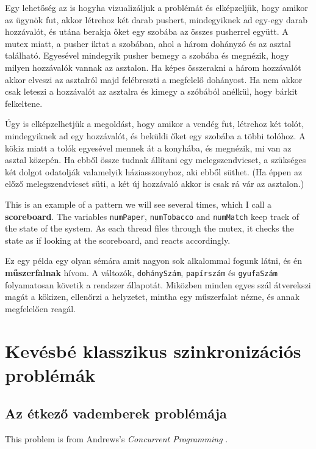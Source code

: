 \documentclass{book}
\newcommand{\clearemptydoublepage}{\newpage\cleardoublepage}
\begin{document}
Egy lehetőség az is hogyha vizualizáljuk a problémát és elképzeljük,
hogy amikor az ügynök fut, akkor létrehoz két darab pushert, mindegyiknek
ad egy-egy darab hozzávalót, és utána berakja őket egy szobába az
összes pusherrel együtt. A mutex miatt, a pusher iktat a szobában,
ahol a három dohányzó és az asztal található. Egyesével mindegyik
pusher bemegy a szobába és megnézik, hogy milyen hozzávalók vannak
az asztalon. Ha képes összerakni a három hozzávalót akkor elveszi
az asztalról majd felébreszti a megfelelő dohányost. Ha nem akkor
csak leteszi a hozzávalót az asztalra és kimegy a szóbából anélkül,
hogy bárkit felkeltene.

Úgy is elképzelhetjük a megoldást, hogy amikor a vendég fut, létrehoz
két tolót, mindegyiknek ad egy hozzávalót, és beküldi őket egy szobába a többi
tolóhoz. A kökiz miatt a tolók egyesével mennek át a konyhába,
és megnézik, mi van az asztal közepén. Ha ebből össze tudnak állítani
egy melegszendvicset, a szükséges két dolgot odatolják valamelyik háziasszonyhoz,
aki ebből süthet. (Ha éppen az előző melegszendvicset süti, a két új hozzávaló akkor
is csak rá vár az asztalon.)

This is an example of a pattern we will see several times, which
I call a {\bf scoreboard}.  The variables {\tt numPaper}, {\tt numTobacco}
and {\tt numMatch} keep track of the state of the system.  As each
thread files through the mutex, it checks the state as if looking
at the scoreboard, and reacts accordingly.

Ez egy példa egy olyan sémára amit nagyon sok alkalommal fogunk látni,
és én {\bf műszerfalnak} hívom. A változók, {\tt dohánySzám}, {\tt papírszám} és {\tt gyufaSzám}
folyamatosan követik a rendszer állapotát. 
Miközben minden egyes szál átverekszi magát a kökizen,
ellenőrzi a helyzetet, mintha egy műszerfalat nézne, és annak megfelelően reagál.

\clearemptydoublepage
\chapter{Kevésbé klasszikus szinkronizációs problémák}
\label{next}


\section{Az étkező vademberek problémája}

This problem is from Andrews's 
{\em Concurrent Programming} \cite{andrews}.
\end{document}
